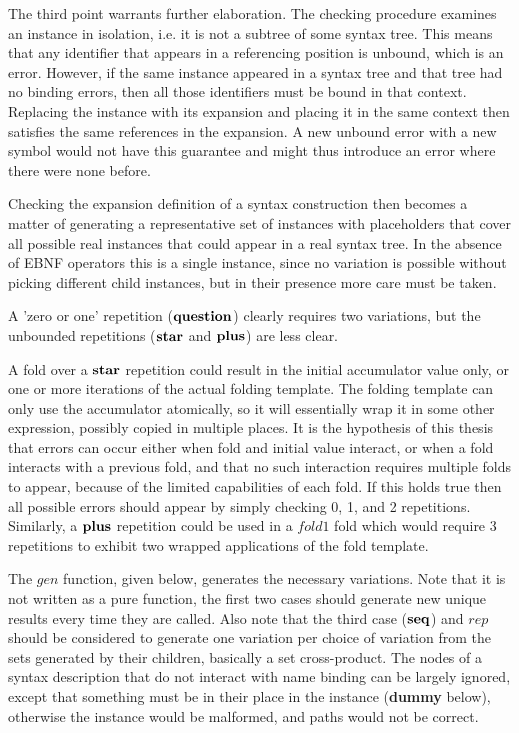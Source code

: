 \documentclass{kththesis}
\begin{document}
The third point warrants further elaboration. The checking procedure examines an instance in isolation, i.e. it is not a subtree of some syntax tree. This means that any identifier that appears in a referencing position is unbound, which is an error. However, if the same instance appeared in a syntax tree and that tree had no binding errors, then all those identifiers must be bound in that context. Replacing the instance with its expansion and placing it in the same context then satisfies the same references in the expansion. A new unbound error with a new symbol would not have this guarantee and might thus introduce an error where there were none before.

Checking the expansion definition of a syntax construction then becomes a matter of generating a representative set of instances with placeholders that cover all possible real instances that could appear in a real syntax tree. In the absence of EBNF operators this is a single instance, since no variation is possible without picking different child instances, but in their presence more care must be taken.

A 'zero or one' repetition ($\mathrel{\mathbf{question}}$) clearly requires two variations, but the unbounded repetitions ($\mathrel{\mathbf{star}}$ and $\mathrel{\mathbf{plus}}$) are less clear.

A fold over a $\mathrel{\mathbf{star}}$ repetition could result in the initial accumulator value only, or one or more iterations of the actual folding template. The folding template can only use the accumulator atomically, so it will essentially wrap it in some other expression, possibly copied in multiple places. It is the hypothesis of this thesis that errors can occur either when fold and initial value interact, or when a fold interacts with a previous fold, and that no such interaction requires multiple folds to appear, because of the limited capabilities of each fold. If this holds true then all possible errors should appear by simply checking 0, 1, and 2 repetitions. Similarly, a $\mathrel{\mathbf{plus}}$ repetition could be used in a $\mathit{fold1}$ fold which would require 3 repetitions to exhibit two wrapped applications of the fold template.

\newcommand{\gen}{\mathit{gen}}
\newcommand{\genrep}{\mathit{rep}}


The $\gen$ function, given below, generates the necessary variations. Note that it is not written as a pure function, the first two cases should generate new unique results every time they are called. Also note that the third case ($\mathrel{\mathbf{seq}}$) and $\genrep$ should be considered to generate one variation per choice of variation from the sets generated by their children, basically a set cross-product. The nodes of a syntax description that do not interact with name binding can be largely ignored, except that something must be in their place in the instance (\textbf{dummy} below), otherwise the instance would be malformed, and paths would not be correct.
\end{document}
